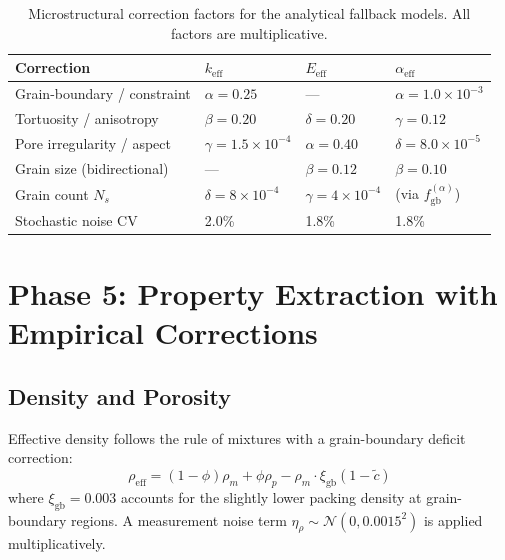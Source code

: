 \documentclass[11pt,a4paper]{article}
\begin{document}
\begin{table}[htbp]
\centering
\caption{Microstructural correction factors for the analytical fallback models. All factors are multiplicative.}
\label{tab:corrections}
\begin{tabular}{@{}llll@{}}
\toprule
\textbf{Correction}          & \textbf{$k_{\text{eff}}$} & \textbf{$E_{\text{eff}}$} & \textbf{$\alpha_{\text{eff}}$} \\
\midrule
Grain-boundary / constraint   & $\alpha = 0.25$           & ---                        & $\alpha = 1.0{\times}10^{-3}$ \\
Tortuosity / anisotropy       & $\beta = 0.20$            & $\delta = 0.20$            & $\gamma = 0.12$ \\
Pore irregularity / aspect    & $\gamma = 1.5{\times}10^{-4}$ & $\alpha = 0.40$        & $\delta = 8.0{\times}10^{-5}$ \\
Grain size (bidirectional)    & ---                       & $\beta = 0.12$             & $\beta = 0.10$ \\
Grain count $N_s$             & $\delta = 8{\times}10^{-4}$ & $\gamma = 4{\times}10^{-4}$ & (via $f_{\text{gb}}^{(\alpha)}$) \\
Stochastic noise CV           & 2.0\%                     & 1.8\%                      & 1.8\% \\
\bottomrule
\end{tabular}
\end{table}

\section{Phase 5: Property Extraction with Empirical Corrections}
\label{sec:phase5}

\subsection{Density and Porosity}

Effective density follows the rule of mixtures with a grain-boundary deficit correction:
\begin{equation}
    \rho_{\text{eff}} = (1 - \phi)\rho_m + \phi\rho_p - \rho_m \cdot \xi_{\text{gb}}(1 - \tilde{c})
\end{equation}
where $\xi_{\text{gb}} = 0.003$ accounts for the slightly lower packing density at grain-boundary regions. A measurement noise term $\eta_\rho \sim \mathcal{N}(0, 0.0015^2)$ is applied multiplicatively.
\end{document}
